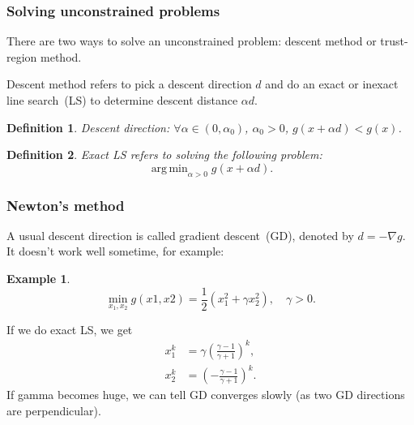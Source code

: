 \documentclass{fancydoc}
\newtheorem{mydef}{Definition}
\newtheorem{ex}{Example}
\DeclareMathOperator*{\argmin}{arg\,min}
\begin{document}
\subsubsection{Solving unconstrained problems}
There are two ways to solve an unconstrained problem: descent method or trust-region method.

Descent method refers to pick a descent direction $d$ and do an exact or inexact line search~(LS) to determine descent distance $\alpha d$.
\bigbreak
\begin{mydef}
	Descent direction: $\forall \alpha \in (0, \alpha_0)$, $\alpha_0 > 0$, $g(x+\alpha d) < g(x)$.
\end{mydef}
\begin{mydef}
	Exact LS refers to solving the following problem:
	\begin{equation*}
	\argmin_{\alpha>0} g(x+\alpha d).
	\end{equation*}
\end{mydef}

\subsubsection{Newton's method}
A usual descent direction is called gradient descent~(GD), denoted by $d=-\nabla g$. It doesn't work well sometime, for example:
\begin{ex}
	\begin{equation}
	\min_{x_1, x_2} g(x1, x2) = \frac{1}{2}(x_1^2 + \gamma x_2^2), \quad \gamma > 0.
	\end{equation}
\end{ex}
If we do exact LS, we get
\begin{subequations}
\begin{align}
x_1^k &= \gamma (\frac{\gamma - 1}{\gamma + 1})^k, \\
x_2^k &= (-\frac{\gamma - 1}{\gamma + 1})^k.
\end{align}
\end{subequations}
If gamma becomes huge, we can tell GD converges slowly (as two GD directions are perpendicular).
\bigbreak 
\end{document}
